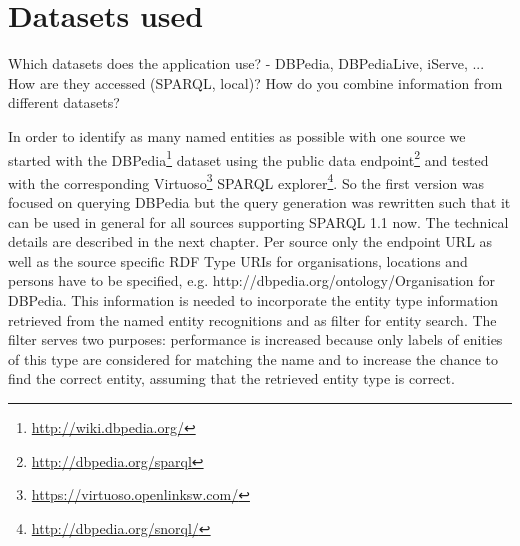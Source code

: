 \documentclass[11pt,titlepage,oneside,openany]{article}
\begin{document}
\section{Datasets used} 
Which datasets does the application use?
- DBPedia, DBPediaLive, iServe, ... 
How are they accessed (SPARQL, local)?
How do you combine information from different datasets? 

In order to identify as many named entities as possible with one source we started with the DBPedia\footnote{\url{http://wiki.dbpedia.org/}} dataset using the public data endpoint\footnote{\url{http://dbpedia.org/sparql}} and tested with the corresponding Virtuoso\footnote{\url{https://virtuoso.openlinksw.com/}} SPARQL explorer\footnote{\url{http://dbpedia.org/snorql/}}. So the first version was focused on querying DBPedia but the query generation was rewritten such that it can be used in general for all sources supporting SPARQL 1.1 now. The technical details are described in the next chapter. Per source only the endpoint URL as well as the source specific RDF Type URIs for organisations, locations and persons have to be specified, e.g. http://dbpedia.org/ontology/Organisation for DBPedia. This information is needed to incorporate the entity type information retrieved from the named entity recognitions and as filter for entity search. The filter serves two purposes: performance is increased because only labels of enities of this type are considered for matching the name and to increase the chance to find the correct entity, assuming that the retrieved entity type is correct. 
\end{document}
